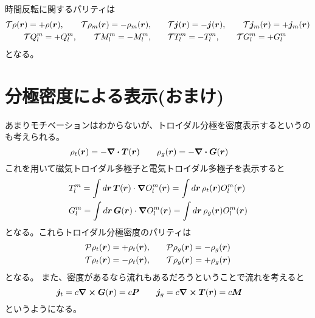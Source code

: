 \documentclass[../../master.tex]{subfiles}
\begin{document}
時間反転に関するパリティは
\begin{align}
    \mathcal{T} \rho(\vb*{r}) = + \rho(\vb*{r}), \qquad
    \mathcal{T} \rho_m(\vb*{r}) = - \rho_m(\vb*{r}), \qquad&
    \mathcal{T} \vb*{j}(\vb*{r}) = - \vb*{j}(\vb*{r}), \qquad
    \mathcal{T} \vb*{j}_m(\vb*{r}) = + \vb*{j}_m(\vb*{r})\\
    \mathcal{T}Q_l^m = +Q_l^m,\qquad
    \mathcal{T}M_l^m = -M_l^m,\qquad&
    \mathcal{T}T_l^m = -T_l^m,\qquad
    \mathcal{T}G_l^m = +G_l^m
\end{align}
となる。

\section{分極密度による表示(おまけ)}
あまりモチベーションはわからないが、トロイダル分極を密度表示するというのも考えられる。
\begin{equation}
    \rho_t(\vb*{r}) = -\div \vb*{T}(\vb*{r}) \qquad
    \rho_g(\vb*{r}) = -\div \vb*{G}(\vb*{r}) \qquad
\end{equation}
これを用いて磁気トロイダル多極子と電気トロイダル多極子を表示すると
\begin{align}
    &T_l^m
    = \int d\vb*{r}\, \vb*{T}(\vb*{r})\cdot \grad O_l^m(\vb*{r})
    = \int d\vb*{r}\, \rho_t(\vb*{r}) O_l^m(\vb*{r})\\
    &G_l^m
    = \int d\vb*{r}\, \vb*{G}(\vb*{r})\cdot \grad O_l^m(\vb*{r})
    = \int d\vb*{r}\, \rho_g(\vb*{r}) O_l^m(\vb*{r})
\end{align}
となる。これらトロイダル分極密度のパリティは
\begin{align}
    \mathcal{P} \rho_t(\vb*{r}) = + \rho_t(\vb*{r}), \qquad&
    \mathcal{P} \rho_g(\vb*{r}) = - \rho_g(\vb*{r}) \\
    \mathcal{T} \rho_t(\vb*{r}) = - \rho_t(\vb*{r}), \qquad&
    \mathcal{T} \rho_g(\vb*{r}) = + \rho_g(\vb*{r})
\end{align}
となる。
また、密度があるなら流れもあるだろうということで流れを考えると
\begin{equation}
    \vb*{j}_t = c \curl \vb*{G} (\vb*{r}) = c \vb*{P} \qquad
    \vb*{j}_g = c \curl \vb*{T} (\vb*{r}) = c \vb*{M} \qquad
\end{equation}
というようになる。
\end{document}
